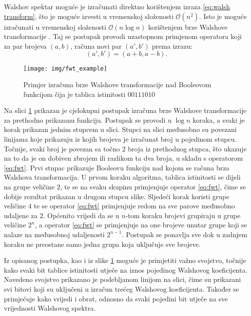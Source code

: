 Walshov spektar moguće je izračunati direktno korištenjem izraza \eqref{eq:walsh transform}, što je moguće izvesti u vremenskoj složenosti $\mathcal{O}(n^2)$.
Isto je moguće izračunati u vremenskoj složenosti $\mathcal{O}(n\log n)$ korištenjem brze Walshove transformacije .
Taj se postupak provodi uzastopnom primjenom operatora koji za par brojeva $(a, b)$, računa novi par $(a', b')$ prema izrazu:
\begin{equation}\label{eq:fwt}
    (a', b') = (a+b, a-b).
\end{equation}
\begin{figure}[ht!] 
    \centering
    \texttt{[image: img/fwt\_example]}
    \captionsetup{justification=centering}
    \caption{Primjer izračuna brze Walshove transformacije nad Booleovom funkcijom čija je tablica istinitosti $00111010$}
    \label{fig:fwt_example}
\end{figure}
Na slici \ref{fig:fwt_example} prikazan je cjelokupni postupak izračuna brze Walshove transformacije za prethodno prikazanu funkciju.
Postupak se provodi u $\log n$ koraka, a svaki je korak prikazan jednim stupcem u slici.
Stupci na slici međusobno su povezani linijama koje prikazuju iz kojih brojeva je izračunat broj u pojedinom stupcu.
Točnije, svaki broj je povezan sa točno $2$ broja iz prethodnog stupca, što ukazuje na to da je on dobiven zbrojem ili razlikom ta dva broja, u skladu s operatorom \eqref{eq:fwt}.
Prvi stupac prikazuje Booleovu funkciju nad kojom se računa brza Walshova transformacija.
U prvom koraku algoritma, tablica istinitosti se dijeli na grupe veličine $2$, te se na svaku skupinu primjenjuje operator \eqref{eq:fwt}, čime se dobije rezultat prikazan u drugom stupcu slike.
Sljedeći korak koristi grupe veličine $4$ te se operator \eqref{eq:fwt} primjenjuje redom na sve parove međusobno udaljene za $2$.
Općenito vrijedi da se u $n$-tom koraku brojevi grupiraju u grupe veličine $2^n$, a operator \eqref{eq:fwt} se primjenjuje na one brojeve unutar grupe koji se nalaze na međusobnoj udaljenosti $2^{n-1}$.
Postupak se ponavlja sve dok u zadnjem koraku ne preostane samo jedna grupa koja uključuje sve brojeve.

Iz opisanog postupka, kao i iz slike \ref{fig:fwt_example} moguće je primjetiti važno svojstvo, točnije kako svaki bit tablice istinitosti utječe na iznos pojedinog Walshovog koeficijenta. 
Navedeno svojstvo prikazano je podebljanom linijom na slici, čime su prikazani svi bitovi koji su uključeni u izračun trećeg Walshovog koeficijenta.
Također se primjećuje kako vrijedi i obrat, odnosno da svaki pojedini bit utječe na sve vrijednosti Walshovog spektra.

